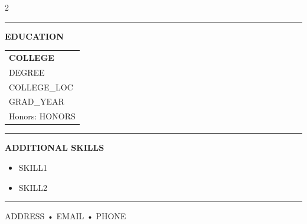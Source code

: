 \documentclass[11pt]{article}
\newcommand{\resumeItem}[1]{
  \item \small{#1}\vspace{-2pt}
}
\newcommand{\resumeSection}[1]{
  \vspace{2mm}
  \par\noindent\textcolor{black}{\rule{2pt}{0.35cm}}
  \hspace{1mm}\textbf{\large #1}\par
  \vspace{1mm}
}
\begin{document}
\vspace{0.3em}
\begin{multicols}{2}
\resumeSection{EDUCATION}

\vspace{-1em}
\begin{tabular}{@{\hspace{-0.7em}}l@{}}
  \textbf{{{COLLEGE}}} \\
  {{{DEGREE}}} \\
  {{{COLLEGE_LOC}}} \\
  {{{GRAD_YEAR}}} \\
  Honors: {{{HONORS}}}
\end{tabular}

\columnbreak

\resumeSection{ADDITIONAL SKILLS}
\vspace{-1em}
\begin{itemize}
  \setlength{\leftmargin}{0.5em}
  \resumeItem{{{SKILL1}}}
  \resumeItem{{{SKILL2}}}
\end{itemize}
\end{multicols}

\vfill
\noindent\rule{\textwidth}{2pt}
\vspace{-1.5em}
\begin{center}
    \small {{{ADDRESS}}} • {{{EMAIL}}} • {{{PHONE}}}
\end{center}
\end{document}
